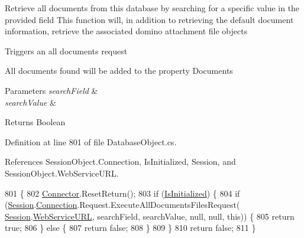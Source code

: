 Retrieve all documents from this database by searching for a specific value in the provided field This function will, in addition to retrieving the default document information, retrieve the associated domino attachment file objects 

Triggers an all documents request

All documents found will be added to the property \textquotesingle{}Documents\textquotesingle{}


\begin{DoxyParams}{Parameters}
{\em search\+Field} & \\
\hline
{\em search\+Value} & \\
\hline
\end{DoxyParams}
\begin{DoxyReturn}{Returns}
Boolean
\end{DoxyReturn}


Definition at line 801 of file Database\+Object.\+cs.



References Session\+Object.\+Connection, Is\+Initialized, Session, and Session\+Object.\+Web\+Service\+U\+RL.


\begin{DoxyCode}
801                                                                                      \{
802         \mbox{\hyperlink{class_connector}{Connector}}.ResetReturn();
803         \textcolor{keywordflow}{if} (\mbox{\hyperlink{class_database_object_a5fe036d32a30eb10d1b3f6a30263f740}{IsInitialized}}) \{
804             \textcolor{keywordflow}{if} (\mbox{\hyperlink{class_database_object_aa8484162b7d2a7c4c9426bca13c64c07}{Session}}.\mbox{\hyperlink{class_session_object_a014bdbf705a753540e19bfb53030c55c}{Connection}}.Request.ExecuteAllDocumentsFilesRequest(
      \mbox{\hyperlink{class_database_object_aa8484162b7d2a7c4c9426bca13c64c07}{Session}}.\mbox{\hyperlink{class_session_object_a697c071c812fbf7ad1166b896fb44c16}{WebServiceURL}}, searchField, searchValue, null, null, \textcolor{keyword}{this})) \{
805                 \textcolor{keywordflow}{return} \textcolor{keyword}{true};
806             \} \textcolor{keywordflow}{else} \{
807                 \textcolor{keywordflow}{return} \textcolor{keyword}{false};
808             \}
809         \}
810         \textcolor{keywordflow}{return} \textcolor{keyword}{false};
811     \}
\end{DoxyCode}
\mbox{\label{class_database_object_a9332713c924ab14195fe51bf0b8d35d1}} 
